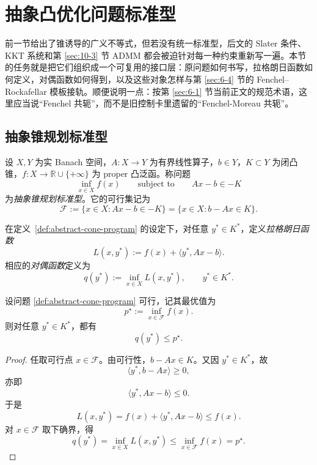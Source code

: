 \section{抽象凸优化问题标准型}

\label{sec:7-2}

前一节给出了锥诱导的广义不等式，但若没有统一标准型，后文的 Slater 条件、KKT 系统和第 \ref{sec:10-3} 节 ADMM 都会被迫针对每一种约束重新写一遍。本节的任务就是把它们组织成一个可复用的接口层：原问题如何书写，拉格朗日函数如何定义，对偶函数如何得到，以及这些对象怎样与第 \ref{sec:6-4} 节的 Fenchel--Rockafellar 模板接轨。顺便说明一点：按第 \ref{sec:6-1} 节当前正文的规范术语，这里应当说“Fenchel 共轭”，而不是旧控制卡里遗留的“Fenchel-Moreau 共轭”。

\subsection{抽象锥规划标准型}

\begin{definition}[抽象锥规划标准型]\label{def:abstract-cone-program}
设 $X,Y$ 为实 Banach 空间，$A\colon X\to Y$ 为有界线性算子，$b\in Y$，$K\subset Y$ 为闭凸锥，$f\colon X\to \mathbb R\cup\{+\infty\}$ 为 proper 凸泛函。称问题
\[
\inf_{x\in X} f(x)\qquad \text{subject to}\qquad Ax-b\in -K
\]
为\emph{抽象锥规划标准型}。它的可行集记为
\[
\mathcal F:=\{x\in X:Ax-b\in -K\}=\{x\in X:b-Ax\in K\}.
\]
\end{definition}

\begin{definition}[锥规划的拉格朗日函数]\label{def:cone-lagrangian}
在定义~\ref{def:abstract-cone-program} 的设定下，对任意 $y^\ast\in K^\ast$，定义\emph{拉格朗日函数}
\[
L(x,y^\ast):=f(x)+\langle y^\ast,Ax-b\rangle.
\]
相应的\emph{对偶函数}定义为
\[
q(y^\ast):=\inf_{x\in X}L(x,y^\ast),\qquad y^\ast\in K^\ast.
\]
\end{definition}

\begin{proposition}[对偶函数给出原问题下界]\label{prop:cone-dual-function-lower-bound}
设问题 \eqref{def:abstract-cone-program} 可行，记其最优值为
\[
p^\star:=\inf_{x\in \mathcal F} f(x).
\]
则对任意 $y^\ast\in K^\ast$，都有
\[
q(y^\ast)\le p^\star.
\]
\end{proposition}

\begin{proof}
任取可行点 $x\in \mathcal F$。由可行性，$b-Ax\in K$。又因 $y^\ast\in K^\ast$，故
\[
\langle y^\ast,b-Ax\rangle\ge 0,
\]
亦即
\[
\langle y^\ast,Ax-b\rangle\le 0.
\]
于是
\[
L(x,y^\ast)=f(x)+\langle y^\ast,Ax-b\rangle\le f(x).
\]
对 $x\in\mathcal F$ 取下确界，得
\[
q(y^\ast)=\inf_{x\in X}L(x,y^\ast)\le \inf_{x\in\mathcal F}f(x)=p^\star.
\]
\end{proof}


